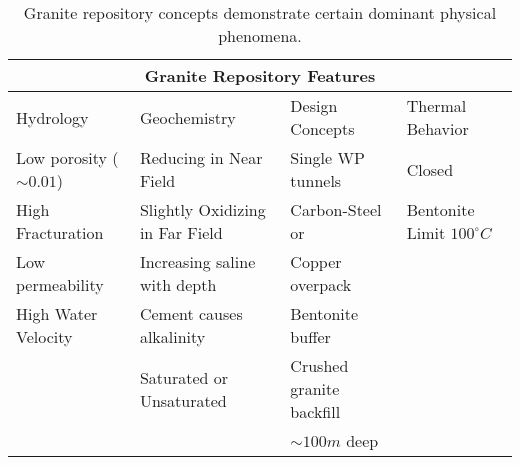 %
\begin{table}[h!]
  \centering
  \footnotesize{
  \begin{tabular}{|l|l|l|l|}
    \multicolumn{4}{c}{\textbf{Granite Repository Features}}\\
    \hline
    Hydrology & Geochemistry & Design Concepts & Thermal Behavior \\ 
    \hline
    Low porosity ($\sim 0.01$)&Reducing in Near Field&Single WP tunnels&Closed\\
    High Fracturation & Slightly Oxidizing in Far Field & Carbon-Steel \cite{andra_granite:_2005}or & Bentonite Limit $100^\circ C$\\
    Low permeability  &  Increasing saline with depth \cite{von_lensa_red-impact_2008} & Copper overpack&\\
    High Water Velocity& Cement causes alkalinity \cite{andra_granite:_2005}& Bentonite buffer &\\
    & Saturated or Unsaturated & Crushed granite backfill \cite{von_lensa_red-impact_2008}& \\
    &&$\sim100m$ deep&\\
    \hline
  \end{tabular}
  \caption[Granite Repository Features]{Granite repository 
  concepts demonstrate certain dominant physical phenomena.}
  \label{tab:granite_tab}
  }
\end{table}


